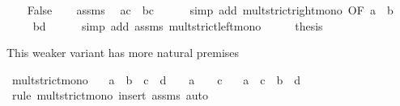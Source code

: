 \begin{isabellebody}
\isanewline
\ \ \isamarkupfalse%
\ False\isanewline
\ \ \isamarkupfalse%
\ assms\ \isamarkupfalse%
\ {\isachardoublequoteopen}a{\isacharasterisk}{\kern0pt}c\ {\isacharless}{\kern0pt}\ b{\isacharasterisk}{\kern0pt}c{\isachardoublequoteclose}\isanewline
\ \ \ \ \isamarkupfalse%
\ {\isacharparenleft}{\kern0pt}simp\ add{\isacharcolon}{\kern0pt}\ mult{\isacharunderscore}{\kern0pt}strict{\isacharunderscore}{\kern0pt}right{\isacharunderscore}{\kern0pt}mono\ {\isacharbrackleft}{\kern0pt}OF\ {\isacartoucheopen}a\ {\isacharless}{\kern0pt}\ b{\isacartoucheclose}{\isacharbrackright}{\kern0pt}{\isacharparenright}{\kern0pt}\isanewline
\ \ \isamarkupfalse%
\ \isamarkupfalse%
\ {\isachardoublequoteopen}{\isasymdots}\ {\isacharless}{\kern0pt}\ b{\isacharasterisk}{\kern0pt}d{\isachardoublequoteclose}\isanewline
\ \ \ \ \isamarkupfalse%
\ {\isacharparenleft}{\kern0pt}simp\ add{\isacharcolon}{\kern0pt}\ assms\ mult{\isacharunderscore}{\kern0pt}strict{\isacharunderscore}{\kern0pt}left{\isacharunderscore}{\kern0pt}mono{\isacharparenright}{\kern0pt}\isanewline
\ \ \isamarkupfalse%
\ \isamarkupfalse%
\ {\isacharquery}{\kern0pt}thesis\ \isacommand{{\isachardot}{\kern0pt}}\isamarkupfalse%
\isanewline
{}\isamarkupfalse%
%
\endisatagproof
{\isafoldproof}%
%
\isadelimproof
%
\endisadelimproof
%
\begin{isamarkuptext}%
This weaker variant has more natural premises%
\end{isamarkuptext}\isamarkuptrue%
\isamarkupfalse%
\ mult{\isacharunderscore}{\kern0pt}strict{\isacharunderscore}{\kern0pt}mono{\isacharprime}{\kern0pt}{\isacharcolon}{\kern0pt}\isanewline
\ \ \ {\isachardoublequoteopen}a\ {\isacharless}{\kern0pt}\ b{\isachardoublequoteclose}\ \ {\isachardoublequoteopen}c\ {\isacharless}{\kern0pt}\ d{\isachardoublequoteclose}\ \ {\isachardoublequoteopen}{}\ {\isasymle}\ a{\isachardoublequoteclose}\ \ {\isachardoublequoteopen}{}\ {\isasymle}\ c{\isachardoublequoteclose}\isanewline
\ \ \ {\isachardoublequoteopen}a\ {\isacharasterisk}{\kern0pt}\ c\ {\isacharless}{\kern0pt}\ b\ {\isacharasterisk}{\kern0pt}\ d{\isachardoublequoteclose}\isanewline
%
\isadelimproof
\ \ %
\endisadelimproof
%
\isatagproof
{}\isamarkupfalse%
\ {\isacharparenleft}{\kern0pt}rule\ mult{\isacharunderscore}{\kern0pt}strict{\isacharunderscore}{\kern0pt}mono{\isacharparenright}{\kern0pt}\ {\isacharparenleft}{\kern0pt}insert\ assms{\isacharcomma}{\kern0pt}\ auto{\isacharparenright}{\kern0pt}%

\end{isabellebody}

